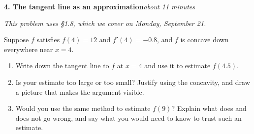 \documentclass[11pt]{article}
\newcommand{\prob}[2]{\medskip\noindent\textbf{\large #1}\hfill\textit{#2}\par\smallskip}
\begin{document}
\prob{4. The tangent line as an approximation}{about 11 minutes}
\noindent\textit{This problem uses \S1.8, which we cover on Monday, September 21.}
\smallskip

Suppose $f$ satisfies $f(4) = 12$ and $f'(4) = -0.8$, and $f$ is concave down everywhere
near $x=4$.
\begin{enumerate}
\item Write down the tangent line to $f$ at $x=4$ and use it to estimate $f(4.5)$.
\item Is your estimate too large or too small? Justify using the concavity, and draw a
picture that makes the argument visible.
\item Would you use the same method to estimate $f(9)$? Explain what does and does not go
wrong, and say what you would need to know to trust such an estimate.
\end{enumerate}
\end{document}
